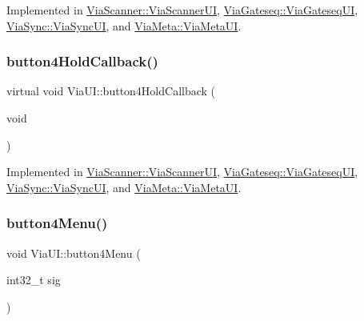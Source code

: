 Implemented in \mbox{\hyperlink{class_via_scanner_1_1_via_scanner_u_i_a45b4492b06d3b834c4934ace2d7d15aa}{Via\+Scanner\+::\+Via\+Scanner\+UI}}, \mbox{\hyperlink{class_via_gateseq_1_1_via_gateseq_u_i_a2f739b43b005baf5bc8dd4d081c5b6d5}{Via\+Gateseq\+::\+Via\+Gateseq\+UI}}, \mbox{\hyperlink{class_via_sync_1_1_via_sync_u_i_a01e30440d48527321570f93d67e93aa5}{Via\+Sync\+::\+Via\+Sync\+UI}}, and \mbox{\hyperlink{class_via_meta_1_1_via_meta_u_i_aef07210c32f8147e6b5ab92b923347e9}{Via\+Meta\+::\+Via\+Meta\+UI}}.

\mbox{\label{class_via_u_i_a11919091b39319fe4d1b3a3f3c7104c5}} 
\subsubsection{\texorpdfstring{button4\+Hold\+Callback()}{button4HoldCallback()}}
{\footnotesize\ttfamily virtual void Via\+U\+I\+::button4\+Hold\+Callback (\begin{DoxyParamCaption}\item[{void}]{ }\end{DoxyParamCaption})\hspace{0.3cm}{\ttfamily [pure virtual]}}



Implemented in \mbox{\hyperlink{class_via_scanner_1_1_via_scanner_u_i_a5d8656812822494d9c202f40ef0882ab}{Via\+Scanner\+::\+Via\+Scanner\+UI}}, \mbox{\hyperlink{class_via_gateseq_1_1_via_gateseq_u_i_a8d4d728d1f66bf2f72ae4e9669895719}{Via\+Gateseq\+::\+Via\+Gateseq\+UI}}, \mbox{\hyperlink{class_via_sync_1_1_via_sync_u_i_a7b84320153b6b7e4ae5499f4092a85d5}{Via\+Sync\+::\+Via\+Sync\+UI}}, and \mbox{\hyperlink{class_via_meta_1_1_via_meta_u_i_aa43b104c1a726fad1c530cb50eb305f6}{Via\+Meta\+::\+Via\+Meta\+UI}}.

\mbox{\label{class_via_u_i_a4d97fe8dca5340f69e5b4441928e4364}} 
\subsubsection{\texorpdfstring{button4\+Menu()}{button4Menu()}}
{\footnotesize\ttfamily void Via\+U\+I\+::button4\+Menu (\begin{DoxyParamCaption}\item[{int32\+\_\+t}]{sig }\end{DoxyParamCaption})}

